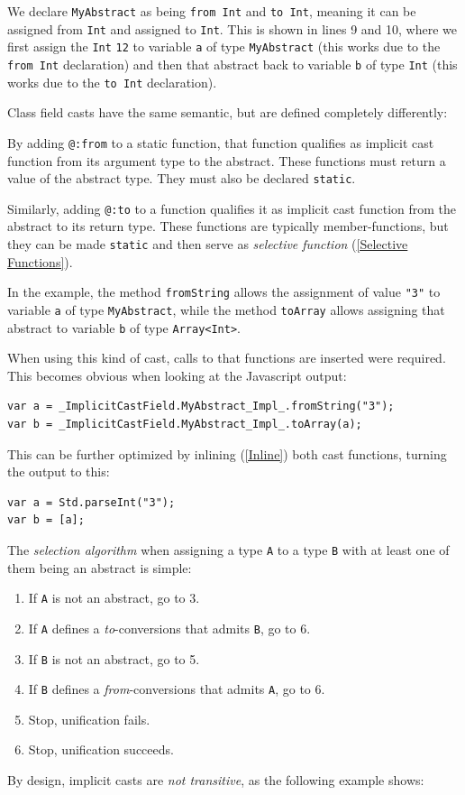 \documentclass{article}
\newcommand{\target}[1]{#1}
\newcommand{\type}[1]{\texttt{#1}}
\newcommand{\expr}[1]{\texttt{#1}}
\begin{document}

We declare \type{MyAbstract} as being \expr{from Int} and \expr{to Int}, meaning it can be assigned from \type{Int} and assigned to \type{Int}. This is shown in lines 9 and 10, where we first assign the \type{Int} \expr{12} to variable \expr{a} of type \type{MyAbstract} (this works due to the \expr{from Int} declaration) and then that abstract back to variable \expr{b} of type \type{Int} (this works due to the \expr{to Int} declaration).

Class field casts have the same semantic, but are defined completely differently:


By adding \expr{@:from} to a static function, that function qualifies as implicit cast function from its argument type to the abstract. These functions must return a value of the abstract type. They must also be declared \expr{static}.

Similarly, adding \expr{@:to} to a function qualifies it as implicit cast function from the abstract to its return type. These functions are typically member-functions, but they can be made \expr{static} and then serve as \emph{selective function} (\cref{Selective Functions}).

In the example, the method \expr{fromString} allows the assignment of value \expr{"3"} to variable \expr{a} of type \type{MyAbstract}, while the method \expr{toArray} allows assigning that abstract to variable \expr{b} of type \type{Array<Int>}.

When using this kind of cast, calls to that functions are inserted were required. This becomes obvious when looking at the \target{Javascript} output:

\begin{lstlisting}
var a = _ImplicitCastField.MyAbstract_Impl_.fromString("3");
var b = _ImplicitCastField.MyAbstract_Impl_.toArray(a);
\end{lstlisting}
This can be further optimized by inlining (\cref{Inline}) both cast functions, turning the output to this:

\begin{lstlisting}
var a = Std.parseInt("3");
var b = [a];
\end{lstlisting}
The \emph{selection algorithm} when assigning a type \expr{A} to a type \expr{B} with at least one of them being an abstract is simple:

\begin{enumerate}
	\item If \expr{A} is not an abstract, go to 3.
	\item If \expr{A} defines a \emph{to}-conversions that admits \expr{B}, go to 6.
	\item If \expr{B} is not an abstract, go to 5.
	\item If \expr{B} defines a \emph{from}-conversions that admits \expr{A}, go to 6.
	\item Stop, unification fails.
	\item Stop, unification succeeds.
\end{enumerate}
By design, implicit casts are \emph{not transitive}, as the following example shows:
\end{document}
